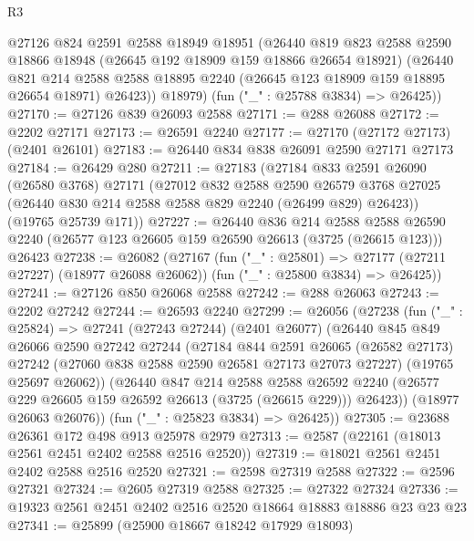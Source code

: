 \begin{lexlean}{R3}
\begin{coremodule}
      @27126
        @824
        @2591
        @2588
        @18949
        @18951
        (@26440
          @819
          @823
          @2588
          @2590
          @18866
          @18948
          (@26645 @192 @18909 @159 @18866 @26654 @18921)
          (@26440
            @821
            @214
            @2588
            @2588
            @18895
            @2240
            (@26645 @123 @18909 @159 @18895 @26654 @18971)
            @26423))
        @18979)
      (fun ("_" : @25788 @3834) => @26425))
@27170 := @27126 @839 @26093 @2588
@27171 := @288 @26088
@27172 := @2202 @27171
@27173 := @26591 @2240
@27177 := @27170 (@27172 @27173) (@2401 @26101)
@27183 := @26440 @834 @838 @26091 @2590 @27171 @27173
@27184 := @26429 @280
@27211 := @27183
    (@27184
      @833
      @2591
      @26090
      (@26580 @3768)
      @27171
      (@27012
        @832
        @2588
        @2590
        @26579
        @3768
        @27025
        (@26440 @830 @214 @2588 @2588 @829 @2240 (@26499 @829) @26423))
      (@19765 @25739 @171))
@27227 := @26440
    @836
    @214
    @2588
    @2588
    @26590
    @2240
    (@26577 @123 @26605 @159 @26590 @26613 (@3725 (@26615 @123)))
    @26423
@27238 := @26082
    (@27167
      (fun ("_" : @25801) => @27177 (@27211 @27227) (@18977 @26088 @26062))
      (fun ("_" : @25800 @3834) => @26425))
@27241 := @27126 @850 @26068 @2588
@27242 := @288 @26063
@27243 := @2202 @27242
@27244 := @26593 @2240
@27299 := @26056
    (@27238
      (fun ("_" : @25824) =>
      @27241
        (@27243 @27244)
        (@2401 @26077)
        (@26440
          @845
          @849
          @26066
          @2590
          @27242
          @27244
          (@27184
            @844
            @2591
            @26065
            (@26582 @27173)
            @27242
            (@27060 @838 @2588 @2590 @26581 @27173 @27073 @27227)
            (@19765 @25697 @26062))
          (@26440
            @847
            @214
            @2588
            @2588
            @26592
            @2240
            (@26577 @229 @26605 @159 @26592 @26613 (@3725 (@26615 @229)))
            @26423))
        (@18977 @26063 @26076))
      (fun ("_" : @25823 @3834) => @26425))
@27305 := @23688 @26361 @172 @498 @913 @25978 @2979
@27313 := @2587 (@22161 (@18013 @2561 @2451 @2402 @2588 @2516 @2520))
@27319 := @18021 @2561 @2451 @2402 @2588 @2516 @2520
@27321 := @2598 @27319 @2588
@27322 := @2596 @27321
@27324 := @2605 @27319 @2588
@27325 := @27322 @27324
@27336 := @19323 @2561 @2451 @2402 @2516 @2520 @18664 @18883 @18886 @23 @23 @23
@27341 := @25899 (@25900 @18667 @18242 @17929 @18093)

\end{coremodule}
\end{lexlean}

